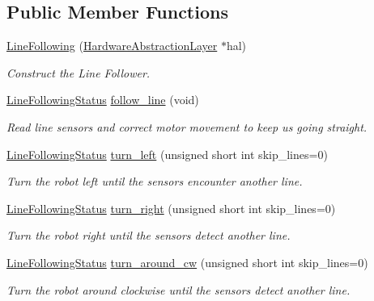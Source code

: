 \subsection*{Public Member Functions}
\begin{DoxyCompactItemize}
\item 
\hyperlink{classIDP_1_1LineFollowing_a0a8b7e1ecdff2e4d0949b01fcf7609ef}{LineFollowing} (\hyperlink{classIDP_1_1HardwareAbstractionLayer}{HardwareAbstractionLayer} $\ast$hal)
\begin{DoxyCompactList}\small\item\em Construct the Line Follower. \item\end{DoxyCompactList}\item 
\hyperlink{namespaceIDP_a5993bdfdd901fc5521c8df42dca43bd0}{LineFollowingStatus} \hyperlink{classIDP_1_1LineFollowing_ad26d7726d2bb263658ed3140d3e30852}{follow\_\-line} (void)
\begin{DoxyCompactList}\small\item\em Read line sensors and correct motor movement to keep us going straight. \item\end{DoxyCompactList}\item 
\hyperlink{namespaceIDP_a5993bdfdd901fc5521c8df42dca43bd0}{LineFollowingStatus} \hyperlink{classIDP_1_1LineFollowing_a9ea6fb8c919ae5004900b85eed57da1e}{turn\_\-left} (unsigned short int skip\_\-lines=0)
\begin{DoxyCompactList}\small\item\em Turn the robot left until the sensors encounter another line. \item\end{DoxyCompactList}\item 
\hyperlink{namespaceIDP_a5993bdfdd901fc5521c8df42dca43bd0}{LineFollowingStatus} \hyperlink{classIDP_1_1LineFollowing_a4efba97b525541668fd4d260273e0eff}{turn\_\-right} (unsigned short int skip\_\-lines=0)
\begin{DoxyCompactList}\small\item\em Turn the robot right until the sensors detect another line. \item\end{DoxyCompactList}\item 
\hyperlink{namespaceIDP_a5993bdfdd901fc5521c8df42dca43bd0}{LineFollowingStatus} \hyperlink{classIDP_1_1LineFollowing_aee1db6498424887b8c6c2e02a92ff997}{turn\_\-around\_\-cw} (unsigned short int skip\_\-lines=0)
\begin{DoxyCompactList}\small\item\em Turn the robot around clockwise until the sensors detect another line. \item\end{DoxyCompactList}\item 

\end{DoxyCompactItemize}
